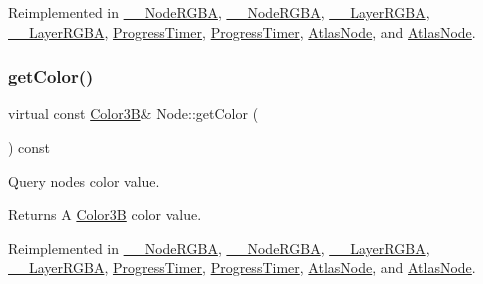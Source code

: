 Reimplemented in \hyperlink{class____NodeRGBA_a730149ff787a7a86d78a5c0d0aecddda}{\+\_\+\+\_\+\+Node\+R\+G\+BA}, \hyperlink{class____NodeRGBA_a730149ff787a7a86d78a5c0d0aecddda}{\+\_\+\+\_\+\+Node\+R\+G\+BA}, \hyperlink{class____LayerRGBA_ab14530232cae13fbf4399e0a47daa315}{\+\_\+\+\_\+\+Layer\+R\+G\+BA}, \hyperlink{class____LayerRGBA_ab14530232cae13fbf4399e0a47daa315}{\+\_\+\+\_\+\+Layer\+R\+G\+BA}, \hyperlink{classProgressTimer_ad8ca5deb560d078fcd576c896981b5c2}{Progress\+Timer}, \hyperlink{classProgressTimer_acf6cb8de15ca3e8954c05a64adec8402}{Progress\+Timer}, \hyperlink{classAtlasNode_a2921f746aab7922633bcd18790619e75}{Atlas\+Node}, and \hyperlink{classAtlasNode_a9d19a5b168ff065c4cb565a94f9f3d7f}{Atlas\+Node}.

\mbox{\label{classNode_af9507fbd163ea92784f52f4cd15c000d}} 
\subsubsection{\texorpdfstring{get\+Color()}{getColor()}\hspace{0.1cm}{\footnotesize\ttfamily [2/2]}}
{\footnotesize\ttfamily virtual const \hyperlink{structColor3B}{Color3B}\& Node\+::get\+Color (\begin{DoxyParamCaption}{ }\end{DoxyParamCaption}) const\hspace{0.3cm}{\ttfamily [virtual]}}

Query node\textquotesingle{}s color value. \begin{DoxyReturn}{Returns}
A \hyperlink{structColor3B}{Color3B} color value. 
\end{DoxyReturn}


Reimplemented in \hyperlink{class____NodeRGBA_a730149ff787a7a86d78a5c0d0aecddda}{\+\_\+\+\_\+\+Node\+R\+G\+BA}, \hyperlink{class____NodeRGBA_a730149ff787a7a86d78a5c0d0aecddda}{\+\_\+\+\_\+\+Node\+R\+G\+BA}, \hyperlink{class____LayerRGBA_ab14530232cae13fbf4399e0a47daa315}{\+\_\+\+\_\+\+Layer\+R\+G\+BA}, \hyperlink{class____LayerRGBA_ab14530232cae13fbf4399e0a47daa315}{\+\_\+\+\_\+\+Layer\+R\+G\+BA}, \hyperlink{classProgressTimer_ad8ca5deb560d078fcd576c896981b5c2}{Progress\+Timer}, \hyperlink{classProgressTimer_acf6cb8de15ca3e8954c05a64adec8402}{Progress\+Timer}, \hyperlink{classAtlasNode_a2921f746aab7922633bcd18790619e75}{Atlas\+Node}, and \hyperlink{classAtlasNode_a9d19a5b168ff065c4cb565a94f9f3d7f}{Atlas\+Node}.

